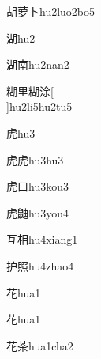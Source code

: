 \begin{verbete}[9;11;2]{胡萝卜}{hu2luo2bo5}
\end{verbete}

\begin{verbete}[12]{湖}{hu2}
\end{verbete}

\begin{verbete*}[12;9]{湖南}{hu2nan2}
\end{verbete*}

\begin{verbete}[15;7;15;10]{糊里糊涂}[\\]{hu2li5hu2tu5}
\end{verbete}

\begin{verbete}[8]{虎}{hu3}
\end{verbete}

\begin{verbete}[8;8]{虎虎}{hu3hu3}
\end{verbete}

\begin{verbete}[8;3]{虎口}{hu3kou3}
\end{verbete}

\begin{verbete}[8;18]{虎鼬}{hu3you4}
\end{verbete}

\begin{verbete}[4;9]{互相}{hu4xiang1}
\end{verbete}

\begin{verbete}[7;13]{护照}{hu4zhao4}
\end{verbete}

\begin{verbete}[7]{花}{hua1}
\end{verbete}
\begin{verbete*}[7]{花}{hua1}
\end{verbete*}

\begin{verbete}[7;9]{花茶}{hua1cha2}
\end{verbete}

